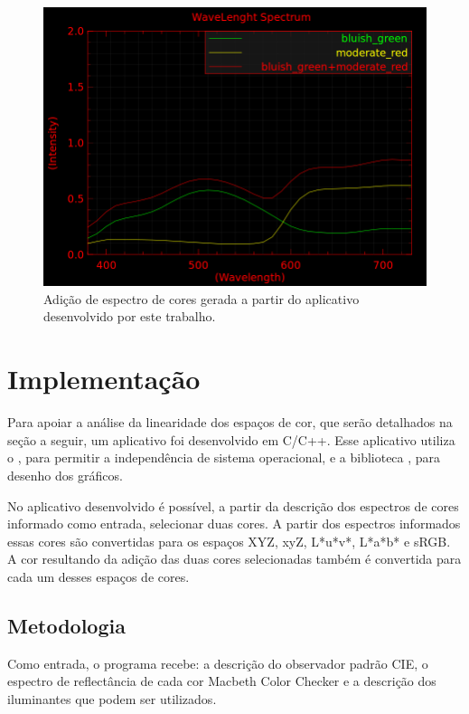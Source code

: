 \documentclass[a4paper,10pt]{report}
\begin{document}
\begin{figure}[!htb]
     \centering
     \includegraphics[scale=0.6]{img/color_addition.png}
     \caption{Adição de espectro de cores gerada a partir do aplicativo
desenvolvido por este trabalho.}
     \label{fig:color_addition}
\end{figure}

\section{Implementação}
Para apoiar a análise da linearidade dos espaços de cor, que serão detalhados
na seção a seguir, um aplicativo foi desenvolvido em C/C++. Esse aplicativo
utiliza o , para permitir a
independência de
sistema operacional, e a biblioteca
, para desenho dos
gráficos.

\par
No aplicativo desenvolvido é possível, a partir da descrição dos espectros de
cores informado como entrada, selecionar duas cores. A partir dos espectros
informados essas cores são convertidas para os espaços XYZ, xyZ, L*u*v*,
L*a*b* e sRGB. A cor resultando da adição das duas cores selecionadas também é
convertida para cada um desses espaços de cores.

\subsection{Metodologia}
\par
Como entrada, o programa recebe: a descrição do observador padrão CIE, o
espectro de reflectância de cada cor Macbeth Color Checker e a
descrição dos iluminantes que podem ser utilizados.
\end{document}
